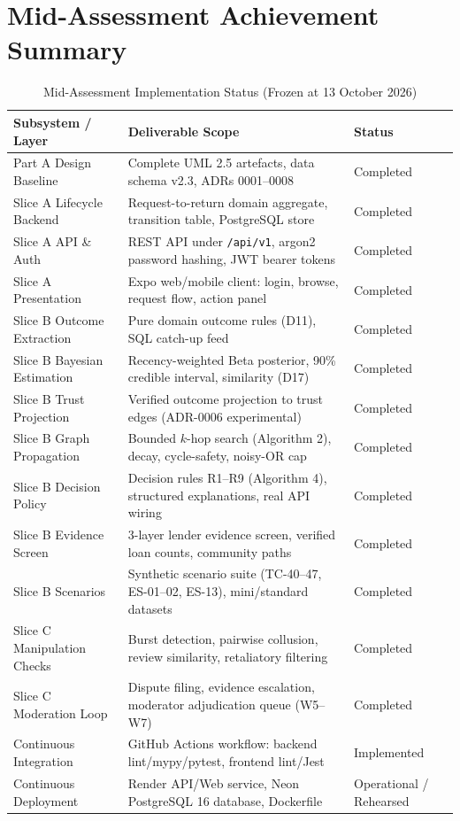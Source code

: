 \section*{Mid-Assessment Achievement Summary}
\begin{table}[htbp]
\centering
\caption{Mid-Assessment Implementation Status (Frozen at 13 October 2026)}
\label{tab:mid_status}
\small
\begin{tabularx}{\textwidth}{l p{7.5cm} l}
\toprule
\textbf{Subsystem / Layer} & \textbf{Deliverable Scope} & \textbf{Status} \\
\midrule
Part A Design Baseline & Complete UML 2.5 artefacts, data schema v2.3, ADRs 0001--0008 & Completed \\
Slice A Lifecycle Backend & Request-to-return domain aggregate, transition table, PostgreSQL store & Completed \\
Slice A API \& Auth & REST API under \texttt{/api/v1}, argon2 password hashing, JWT bearer tokens & Completed \\
Slice A Presentation & Expo web/mobile client: login, browse, request flow, action panel & Completed \\
Slice B Outcome Extraction & Pure domain outcome rules (D11), SQL catch-up feed & Completed \\
Slice B Bayesian Estimation & Recency-weighted Beta posterior, 90\% credible interval, similarity (D17) & Completed \\
Slice B Trust Projection & Verified outcome projection to trust edges (ADR-0006 experimental) & Completed \\
Slice B Graph Propagation & Bounded $k$-hop search (Algorithm 2), decay, cycle-safety, noisy-OR cap & Completed \\
Slice B Decision Policy & Decision rules R1--R9 (Algorithm 4), structured explanations, real API wiring & Completed \\
Slice B Evidence Screen & 3-layer lender evidence screen, verified loan counts, community paths & Completed \\
Slice B Scenarios & Synthetic scenario suite (TC-40--47, ES-01--02, ES-13), mini/standard datasets & Completed \\
Slice C Manipulation Checks & Burst detection, pairwise collusion, review similarity, retaliatory filtering & Completed \\
Slice C Moderation Loop & Dispute filing, evidence escalation, moderator adjudication queue (W5--W7) & Completed \\
Continuous Integration & GitHub Actions workflow: backend lint/mypy/pytest, frontend lint/Jest & Implemented \\
Continuous Deployment & Render API/Web service, Neon PostgreSQL 16 database, Dockerfile & Operational / Rehearsed \\
\bottomrule
\end{tabularx}
\end{table}
